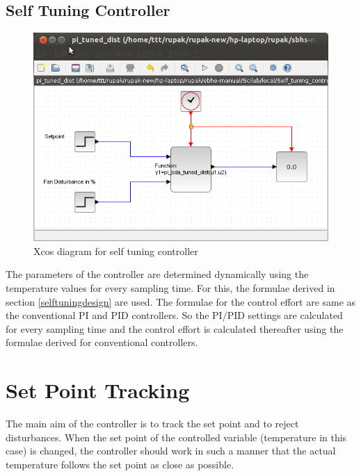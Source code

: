 \newpage
\subsection{Self Tuning Controller}
\begin{figure}[h]
\centering
	\includegraphics[width = \textwidth]{Vikas_self/report_tex/implementation/pi_dist_self.png}
		\caption{Xcos diagram for self tuning controller}
	\label{selftuning}
\end{figure}

The parameters of the controller are determined dynamically using the temperature values for every sampling time. 
For this, the formulae derived in section \ref{selftuningdesign} are used. The formulae for the control effort are same 
as the conventional PI and PID controllers. So the PI/PID settings are calculated for every sampling time and the control 
effort is calculated thereafter using the formulae derived for conventional controllers.

\section{Set Point Tracking}

The main aim of the controller is to track the set point and to reject disturbances. When the set point of the controlled
variable (temperature in this case) is changed, the controller should work in such a manner that the actual temperature
follows the set point as close as possible.\\

